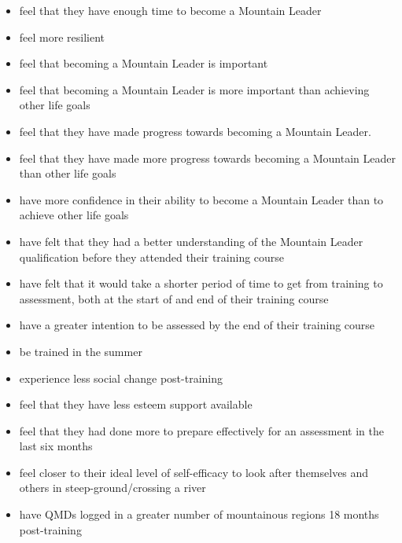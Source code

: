 \documentclass[
  12pt,
  a4paper,
]{book}
\providecommand{\tightlist}{%
  \setlength{\itemsep}{0pt}\setlength{\parskip}{0pt}}
\begin{document}
\begin{itemize}
\tightlist
\item
  feel that they have enough time to become a Mountain Leader
\item
  feel more resilient
\item
  feel that becoming a Mountain Leader is important
\item
  feel that becoming a Mountain Leader is more important than achieving other life goals
\item
  feel that they have made progress towards becoming a Mountain Leader.
\item
  feel that they have made more progress towards becoming a Mountain Leader than other life goals
\item
  have more confidence in their ability to become a Mountain Leader than to achieve other life goals
\item
  have felt that they had a better understanding of the Mountain Leader qualification before they attended their training course
\item
  have felt that it would take a shorter period of time to get from training to assessment, both at the start of and end of their training course
\item
  have a greater intention to be assessed by the end of their training course
\item
  be trained in the summer
\item
  experience less social change post-training
\item
  feel that they have less esteem support available
\item
  feel that they had done more to prepare effectively for an assessment in the last six months
\item
  feel closer to their ideal level of self-efficacy to look after themselves and others in steep-ground/crossing a river
\item
  have QMDs logged in a greater number of mountainous regions 18 months post-training
\end{itemize}
\end{document}
